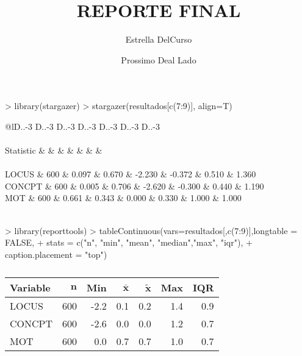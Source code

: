 \documentclass{article}
\title{REPORTE FINAL}
\author[1]{\normalsize Estrella DelCurso}
\author[2]{\normalsize Prossimo Deal Lado}
\affil[1,2]{\small  Especialidad de Psicologia,PUCP\\
\texttt{{delcurso,deallado}@pucp.edu.pe}}
\begin{document}
\maketitle






\begin{Schunk}
\begin{Sinput}
> library(stargazer)
> stargazer(resultados[c(7:9)], align=T)
\end{Sinput}
% Table created by stargazer v.5.2.2 by Marek Hlavac, Harvard University. E-mail: hlavac at fas.harvard.edu
% Date and time: Wed, Sep 18, 2019 - 13:44:43
% Requires LaTeX packages: dcolumn 
\begin{table}[!htbp] \centering 
  \caption{} 
  \label{} 
\begin{tabular}{@{\extracolsep{5pt}}lD{.}{.}{-3} D{.}{.}{-3} D{.}{.}{-3} D{.}{.}{-3} D{.}{.}{-3} D{.}{.}{-3} D{.}{.}{-3} } 
\\[-1.8ex]\hline 
\hline \\[-1.8ex] 
Statistic &  &  &  &  &  &  &  \\ 
\hline \\[-1.8ex] 
LOCUS & 600 & 0.097 & 0.670 & -2.230 & -0.372 & 0.510 & 1.360 \\ 
CONCPT & 600 & 0.005 & 0.706 & -2.620 & -0.300 & 0.440 & 1.190 \\ 
MOT & 600 & 0.661 & 0.343 & 0.000 & 0.330 & 1.000 & 1.000 \\ 
\hline \\[-1.8ex] 
\end{tabular} 
\end{table} \end{Schunk}


\begin{Schunk}
\begin{Sinput}
> library(reporttools)
> tableContinuous(vars=resultados[,c(7:9)],longtable = FALSE,
+                 stats = c("n", "min", "mean", "median","max", "iqr"),
+                 caption.placement = "top")
\end{Sinput}
% latex table generated in R 3.6.0 by xtable 1.8-4 package
% Wed Sep 18 13:44:43 2019
\begin{table}[ht]
\centering
\caption{} 
\label{}
\begingroup\footnotesize
\begin{tabular}{lrrrrrr}
 \textbf{Variable} & $\mathbf{n}$ & \textbf{Min} & $\mathbf{\bar{x}}$ & $\mathbf{\widetilde{x}}$ & \textbf{Max} & \textbf{IQR} \\ 
  \hline
LOCUS & 600 & -2.2 & 0.1 & 0.2 & 1.4 & 0.9 \\ 
  CONCPT & 600 & -2.6 & 0.0 & 0.0 & 1.2 & 0.7 \\ 
  MOT & 600 &  0.0 & 0.7 & 0.7 & 1.0 & 0.7 \\ 
  \end{tabular}
\endgroup
\end{table}\end{Schunk}
\end{document}
